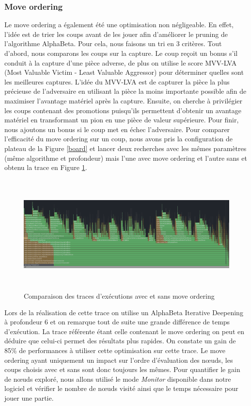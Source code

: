 \documentclass{article}
\begin{document}
\subsubsection{Move ordering}
Le move ordering a également été une optimisation non négligeable. En effet, l'idée est de trier les coups avant de les jouer afin d'améliorer le pruning de l'algorithme AlphaBeta. Pour cela,
nous faisons un tri en 3 critères. Tout d'abord, nous comparons les coups sur la capture. Le coup reçoit un bonus s'il conduit à la capture d'une pièce adverse, de plus on utilise le score MVV-LVA
(Most Valuable Victim - Least Valuable Aggressor) pour déterminer quelles sont les meilleures captures. L'idée du MVV-LVA est de capturer la pièce la plus précieuse de l'adversaire en utilisant la pièce
la moins importante possible afin de maximiser l'avantage matériel après la capture. Ensuite, on cherche à privilégier les coups contenant des promotions puisqu'ils permettent d'obtenir un avantage matériel
en transformant un pion en une pièce de valeur supérieure. Pour finir, nous ajoutons un bonus si le coup met en échec l'adversaire. Pour comparer l'efficacité du move ordering sur un coup, nous avons pris la 
configuration de plateau de la Figure \ref{board} et lancer deux recherches avec les mêmes paramètres (même algorithme et profondeur) mais l'une avec move ordering et l'autre sans et obtenu la trace en Figure \ref{move_ordering_cmp}.
\begin{figure}[h]
    \centering
    \includegraphics[width=\textwidth,height=6.0cm,keepaspectratio]{trace_move_ordering.png}
    \caption{Comparaison des traces d'exécutions avec et sans move ordering}
    \label{move_ordering_cmp}
\end{figure}
\FloatBarrier

Lors de la réalisation de cette trace on utilise un AlphaBeta Iterative Deepening à profondeur 6 et on remarque tout de suite une grande différence de temps d'exécution. La trace référente
étant celle contenant le move ordering on peut en déduire que celui-ci permet des résultats plus rapides. On constate un gain de 85\% de performances à utiliser cette optimisation sur cette trace.
Le move ordering ayant uniquement un impact sur l'ordre d'évaluation des nœuds, les coups choisis avec et sans sont donc toujours les mêmes. Pour quantifier le gain de nœuds exploré, nous allons 
utilisé le mode \textit{Monitor} disponible dans notre logiciel et vérifier le nombre de nœuds visité ainsi que le temps nécessaire pour jouer une partie. 
\end{document}
